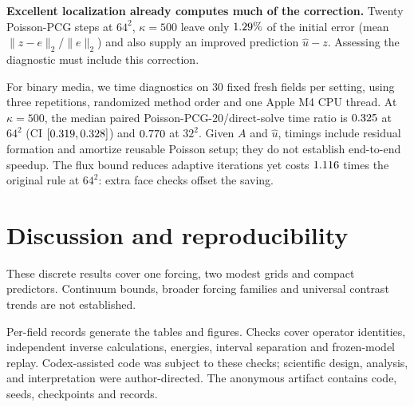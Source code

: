 \documentclass{article}
\begin{document}
\textbf{Excellent localization already computes much of the correction.}
Twenty Poisson-PCG steps at $64^2$, $\kappa=500$ leave only
$1.29\%$ of the initial error (mean $\|z-e\|_2/\|e\|_2$) and
also supply an improved prediction $\hat u-z$. Assessing the diagnostic must include this correction.

For binary media, we time diagnostics on $30$ fixed fresh fields per setting, using three repetitions, randomized
method order and one Apple M4 CPU thread. At $\kappa=500$, the median paired Poisson-PCG-20/direct-solve
time ratio is $0.325$ at $64^2$ (CI $[0.319,0.328]$)
and $0.770$ at $32^2$. Given $A$ and $\hat u$, timings include residual formation and
amortize reusable Poisson setup; they do not establish end-to-end speedup. The flux bound reduces
adaptive iterations yet costs $1.116$ times the original rule at $64^2$:
extra face checks offset the saving.

\section{Discussion and reproducibility}
These discrete results cover one forcing, two modest grids and compact predictors. Continuum
bounds, broader forcing families and universal contrast trends are not established.

Per-field records generate the tables and figures. Checks cover operator identities, independent
inverse calculations, energies, interval separation and frozen-model replay. Codex-assisted code was subject to these checks; scientific design, analysis, and interpretation were author-directed.
The anonymous artifact contains code, seeds, checkpoints and records.



\end{document}
